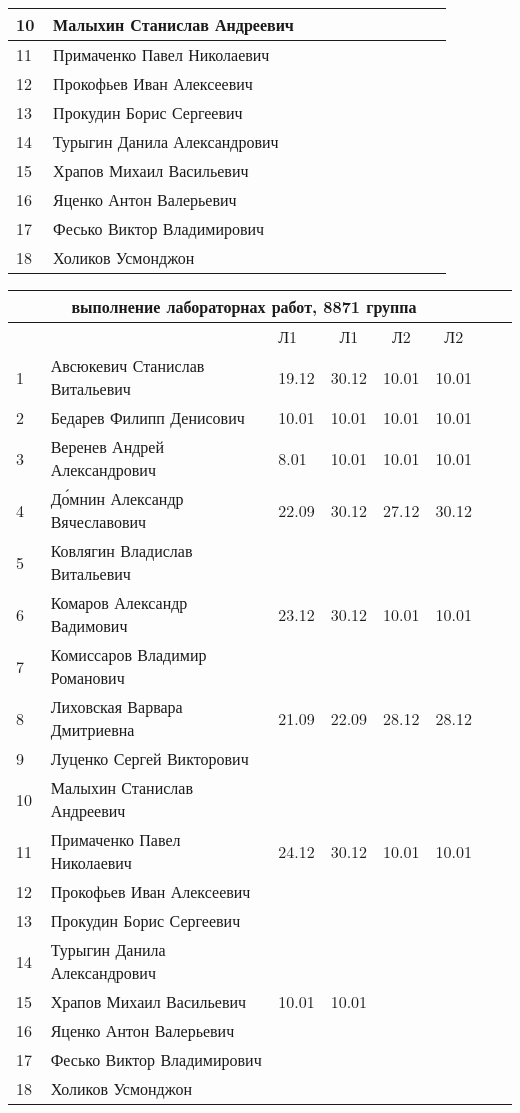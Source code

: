 \documentclass[a4paper,11pt]{article}
\newcommand*\ok{&{\small \ding{51}}} %
\newcommand*\no{&{\small }} %
\begin{document}
\begin{tabular}{p{7pt}|l|p{\CS}|p{\CS}|p{\CS}|p{\CS}|p{\CS}|p{\CS}|p{\CS}|p{\CS}|p{\CS}}
10\,&  Малыхин Станислав Андреевич      \no\no\no&&&&&\\
\midrule
11\,&  Примаченко Павел Николаевич      \no\ok\ok&&&&&\\
12\,&  Прокофьев Иван Алексеевич        \no\no\no&&&&&\\
13\,&  Прокудин Борис Сергеевич         \no\ok\ok&&&&&\\
14\,&  Турыгин Данила Александрович     \no\no\no&&&&\\
15\,&  Храпов Михаил Васильевич         \ok\ok\no&&&&\\
\midrule
16\,&  Яценко Антон Валерьевич          \no\ok\no&&&&&\\
17\,&  Фесько Виктор Владимирович       \no\no\no&&&&&\\
18\,&Холиков Усмонджон                  \no\no\ok&&&&&\\ 
\bottomrule
\end{tabular} 

\newpage
%
\begin{tabular}{l|llc|cccc}
\multicolumn{6}{c}{выполнение лабораторнах работ, 8871 группа} \\
\toprule
&&Л1&Л1& Л2&Л2\\
\midrule
1\,&  Авсюкевич Станислав Витальевич    &19.12& 30.12& 10.01& 10.01\\
2\,&  Бедарев Филипп Денисович          &10.01& 10.01& 10.01& 10.01\\
3\,&  Веренев Андрей Александрович      & 8.01& 10.01& 10.01& 10.01\\
4\,&  Д\'{о}мнин Александр Вячеславович &22.09& 30.12& 27.12& 30.12\\
5\,&   Ковлягин Владислав Витальевич    &&&&\\
\midrule
6\,&  Комаров Александр Вадимович       &23.12& 30.12& 10.01& 10.01\\
7\,&  Комиссаров Владимир Романович     &&&&\\
8\,&  Лиховская Варвара Дмитриевна      &21.09& 22.09& 28.12& 28.12\\
9\,&   Луценко Сергей Викторович        &&&&\\
10\,&  Малыхин Станислав Андреевич      &&&&\\
\midrule
11\,&  Примаченко Павел Николаевич      &24.12& 30.12& 10.01& 10.01\\
12\,&  Прокофьев Иван Алексеевич        &&&&\\
13\,&  Прокудин Борис Сергеевич         &&&&\\
14\,&  Турыгин Данила Александрович     &&&\\
15\,&  Храпов Михаил Васильевич         &10.01&10.01&\\
\midrule
16\,&  Яценко Антон Валерьевич          &&&&\\
17\,&  Фесько Виктор Владимирович       &&&&\\
18\,&Холиков Усмонджон                  &&&&\\
\bottomrule
\end{tabular}
\end{document}
